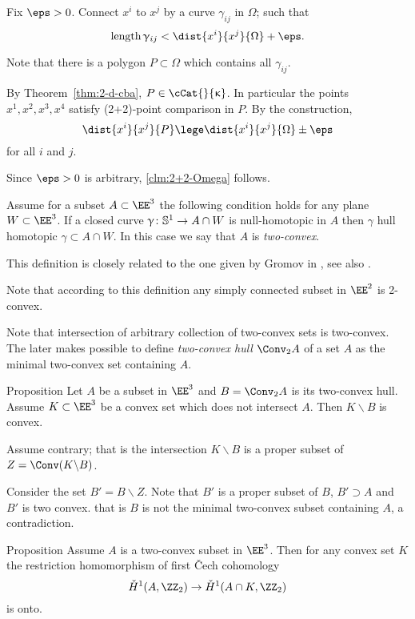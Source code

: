 Fix $\eps>0$.
Connect $x^i$ to $x^j$ by a curve $\gamma_{ij}$ in $\Omega$;
such that 
\[\length\gamma_{ij}<\dist{x^i}{x^j}{\Omega}+\eps.\]

Note that there is a polygon $P\subset \Omega$ 
which contains all $\gamma_{ij}$.

By Theorem~\ref{thm:2-d-cba}, $P\in \cCat{}{\kappa}$.
In particular the points  $x^1,x^2,x^3,x^4$ satisfy (2+2)-point comparison in $P$.
By the construction,
\[\dist{x^i}{x^j}{P}\lege \dist{x^i}{x^j}{\Omega}\pm\eps\]
for all $i$ and $j$.

Since $\eps>0$ is arbitrary, \ref{clm:2+2-Omega} follows.
\qeds

Assume for a subset $A\subset \EE^3$
the following condition holds for any plane $W\subset\EE^3$.
If a closed curve $\gamma\:\SS^1\to A\cap W$ is null-homotopic in $A$
then $\gamma$ 
hull homotopic $\gamma\subset A\cap W$.
In this case we say that $A$ is \emph{two-convex}.

This definition is closely related to the one given by Gromov in \cite[\S\textonehalf]{gromov:SaGMC}, see also \cite{panov-petrunin:sweeping}.

Note that according to this definition any simply connected subset in $\EE^2$ is 2-convex.

Note that intersection of arbitrary collection of  two-convex sets is two-convex.
The later makes possible to define \emph{two-convex hull} $\Conv_2 A$ of a set $A$
as the minimal two-convex set containing $A$.

\begin{thm}{Proposition}
Let $A$ be a subset in $\EE^3$
and $B=\Conv_2 A$ is its two-convex hull.
Assume $K\subset \EE^3$ be a convex set which does not intersect $A$.
Then $K\backslash B$ is convex.
\end{thm}

Assume contrary; 
that is the intersection $K\backslash B$ is a proper subset of $Z=\Conv(K\backslash B)$.

Consider the set $B'=B\backslash Z$. 
Note that $B'$ is a proper subset of $B$,
$B'\supset A$ and $B'$ is two convex.
that is $B$ is not the minimal two-convex subset containing $A$,
a contradiction.
\qeds



\begin{thm}{Proposition}\label{prop:stong-two-convex}
Assume $A$ is a  two-convex subset in $\EE^3$.
Then for any convex set $K$ the restriction homomorphism of first \v{C}ech cohomology
\[\check{H}^1(A,\ZZ_2)\to \check{H}^1(A\cap K,\ZZ_2)\]
is onto.
\end{thm}

